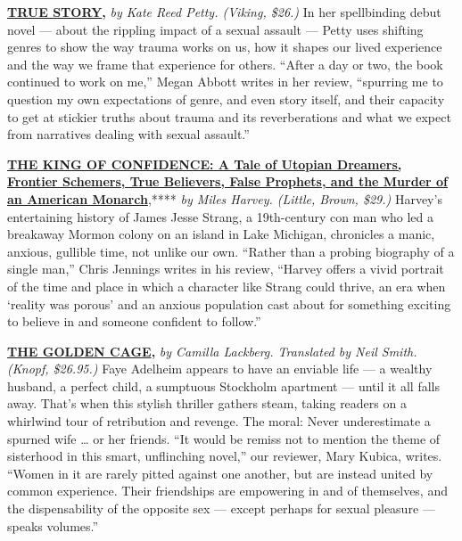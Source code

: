 \href{https://www.nytimes3xbfgragh.onion/2020/07/24/books/review/kate-reed-petty-true-story.html}{\textbf{\textbf{TRUE
STORY}}}\textbf{\textbf{,}} \emph{by Kate Reed Petty. (Viking, \$26.)}
In her spellbinding debut novel --- about the rippling impact of a
sexual assault --- Petty uses shifting genres to show the way trauma
works on us, how it shapes our lived experience and the way we frame
that experience for others. ``After a day or two, the book continued to
work on me,'' Megan Abbott writes in her review, ``spurring me to
question my own expectations of genre, and even story itself, and their
capacity to get at stickier truths about trauma and its reverberations
and what we expect from narratives dealing with sexual assault.''

\textbf{\href{https://www.nytimes3xbfgragh.onion/2020/07/14/books/review/king-of-confidence-miles-harvey-james-jesse-strang.html}{\textbf{THE
KING OF CONFIDENCE: A Tale of Utopian Dreamers, Frontier Schemers, True
Believers, False Prophets, and the Murder of an American Monarch}}},****
\emph{by Miles Harvey. (Little, Brown, \$29.)} Harvey's entertaining
history of James Jesse Strang, a 19th-century con man who led a
breakaway Mormon colony on an island in Lake Michigan, chronicles a
manic, anxious, gullible time, not unlike our own. ``Rather than a
probing biography of a single man,'' Chris Jennings writes in his
review, ``Harvey offers a vivid portrait of the time and place in which
a character like Strang could thrive, an era when `reality was porous'
and an anxious population cast about for something exciting to believe
in and someone confident to follow.''

\href{https://www.nytimes3xbfgragh.onion/2020/07/07/books/review/the-golden-cage-camilla-lackberg.html}{\textbf{\textbf{THE
GOLDEN CAGE}}}\textbf{\textbf{,}} \emph{by Camilla Lackberg. Translated
by Neil Smith. (Knopf, \$26.95.)} Faye Adelheim appears to have an
enviable life --- a wealthy husband, a perfect child, a sumptuous
Stockholm apartment --- until it all falls away. That's when this
stylish thriller gathers steam, taking readers on a whirlwind tour of
retribution and revenge. The moral: Never underestimate a spurned wife
\ldots{} or her friends. ``It would be remiss not to mention the theme
of sisterhood in this smart, unflinching novel,'' our reviewer, Mary
Kubica, writes. ``Women in it are rarely pitted against one another, but
are instead united by common experience. Their friendships are
empowering in and of themselves, and the dispensability of the opposite
sex --- except perhaps for sexual pleasure --- speaks volumes.''

